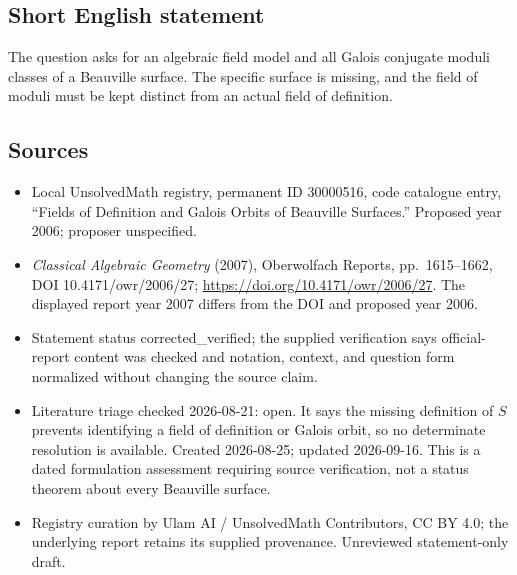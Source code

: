 \documentclass[11pt]{article}
\begin{document}
\subsection{Short English statement}
The question asks for an algebraic field model and all Galois conjugate moduli classes of a Beauville surface. The specific surface is missing, and the field of moduli must be kept distinct from an actual field of definition.
\subsection{Sources}
\begin{itemize}
\item Local UnsolvedMath registry, permanent ID 30000516, code catalogue entry, ``Fields of Definition and Galois Orbits of Beauville Surfaces.'' Proposed year 2006; proposer unspecified.
\item \emph{Classical Algebraic Geometry} (2007), Oberwolfach Reports, pp.\ 1615--1662, DOI 10.4171/owr/2006/27; \url{https://doi.org/10.4171/owr/2006/27}. The displayed report year 2007 differs from the DOI and proposed year 2006.
\item Statement status corrected\_verified; the supplied verification says official-report content was checked and notation, context, and question form normalized without changing the source claim.
\item Literature triage checked 2026-08-21: open. It says the missing definition of $S$ prevents identifying a field of definition or Galois orbit, so no determinate resolution is available. Created 2026-08-25; updated 2026-09-16. This is a dated formulation assessment requiring source verification, not a status theorem about every Beauville surface.
\item Registry curation by Ulam AI / UnsolvedMath Contributors, CC BY 4.0; the underlying report retains its supplied provenance. Unreviewed statement-only draft.
\end{itemize}
\end{document}
